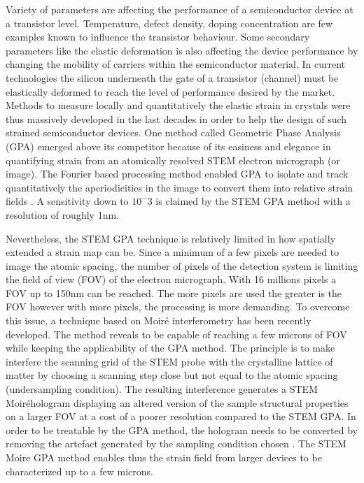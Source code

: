 \documentclass{article}
\begin{document}
Variety of parameters are affecting the performance of a semiconductor device at a transistor level. Temperature, defect density, doping concentration are few examples known to influence the transistor behaviour. Some secondary parameters like the elastic deformation is also affecting the device performance by changing the mobility of carriers within the semiconductor material. In current technologies the silicon underneath the gate of a transistor (channel) must be elastically deformed to reach the level of performance desired by the market. Methods to measure locally and quantitatively the elastic strain in crystals were thus massively developed in the last decades in order to help the design of such strained semiconductor devices. One method called Geometric Phase Analysis (GPA) emerged above its competitor because of its easiness and elegance in quantifying strain from an atomically resolved STEM electron micrograph (or image). The Fourier based processing method enabled GPA to isolate and track quantitatively the aperiodicities in the image to convert them into relative strain fields \cite{Hytch1998}. A sensitivity down to $10^-3$ is claimed by the STEM GPA method with a resolution of roughly 1nm. \par \medskip
Nevertheless, the STEM GPA technique is relatively limited in how spatially extended a strain map can be. Since a minimum of a few pixels are needed to image the atomic spacing, the number of pixels of the detection system is limiting the field of view (FOV) of the electron micrograph. With 16 millions pixels a FOV up to 150nm can be reached. The more pixels are used the greater is the FOV however with more pixels, the processing is more demanding. To overcome this issue, a technique based on Moir{\'e} interferometry has been recently developed. The method reveals to be capable of reaching a few microns of FOV while keeping the applicability of the GPA method. The principle is to make interfere the scanning grid of the STEM probe with the crystalline lattice of matter by choosing a scanning step close but not equal to the atomic spacing (undersampling condition). The resulting interference generates a STEM Moir{\'e}hologram displaying an altered version of the sample structural properties on a larger FOV at a cost of a poorer resolution compared to the STEM GPA. In order to be treatable by the GPA method, the hologram needs to be converted by removing the artefact generated by the sampling condition chosen \cite{Pofelski2017}. The STEM Moire GPA method enables thus the strain field from larger devices to be characterized up to a few microns.
\end{document}
